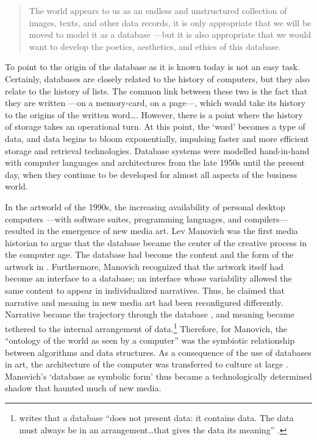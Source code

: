 \begin{quote}
	The world appears to us as an endless and unstructured collection of images, texts, and other data records, it is only appropriate that we will be moved to model it as a database ---but it is also appropriate that we would want to develop the poetics, aesthetics, and ethics of this database. \parencite[219]{Man01:The}
\end{quote}

To point to the origin of the database as it is known today is not an easy task. Certainly, databases are closely related to the history of computers, but they also relate to the history of lists. The common link between these two is the fact that they are written ---on a memory-card, on a page---, which would take its history to the origins of the written word\dots. However, there is a point where the history of storage takes an operational turn. At this point, the `word' becomes a type of data, and data begins to bloom exponentially, impulsing faster and more efficient storage and retrieval technologies. Database systems were modelled hand-in-hand with computer languages and architectures from the late 1950s until the present day, when they continue to be developed for almost all aspects of the business world.

In the artworld of the 1990s, the increasing availability of personal desktop computers ---with software suites, programming languages, and compilers--- resulted in the emergence of new media art. Lev Manovich \parencite{Man01:The} was the first media historian to argue that the database became the center of the creative process in the computer age. The database had become the content and the form of the artwork in . Furthermore, Manovich recognized that the artwork itself had become an interface to a database; an interface whose variability allowed the same content to appear in individualized narratives. Thus, he claimed that narrative and meaning in new media art had been reconfigured differently. Narrative became the trajectory through the database \parencite[227]{Man01:The}, and meaning became tethered to the internal arrangement of data.\footnote{\textcite{Wei07:Oce} writes that a database ``does not present data: it contains data. The data must always be in an arrangement\dots that gives the data its meaning'' \parencite[67-9]{Wei07:Oce}.} Therefore, for Manovich, the ``ontology of the world as seen by a computer'' \parencite[223]{Man01:The} was the symbiotic relationship between algorithms and data structures. As a consequence of the use of databases in art, the architecture of the computer was transferred to culture at large \parencite[235]{Man01:The}. Manovich's `database as symbolic form' thus became a technologically determined shadow that haunted much of new media.
